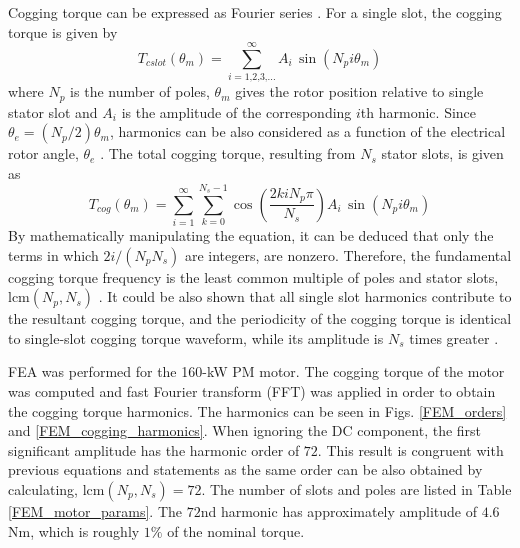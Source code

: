 Cogging torque can be expressed as Fourier series \cite{CTR_HW:2002, CTR_HW:2004, cogging:2006, CTR:2010, CTR_HW:2013, CTR_HW_skew:2013, CTR_SW:2017, CTR_HW:2017}. For a single slot, the cogging torque is given by \cite{cogging:2006, CTR_HW:2013}
\begin{equation}
    T_{cslot}(\theta_m) = \sum_{i=\text{1,2,3,...}}^{\infty} A_i \, \sin(N_pi\theta_m)
    \label{eq_cogging_torque1}
\end{equation}
where $N_p$ is the number of poles, $\theta_m$ gives the rotor position relative to single stator slot and $A_i$ is the amplitude of the corresponding $i$th harmonic. Since $\theta_e = (N_p/2)\theta_m$, harmonics can be also considered as a function of the electrical rotor angle, $\theta_e$ \cite{ILC:2012, ILC:2018}. The total cogging torque, resulting from $N_s$ stator slots, is given as \cite{cogging:2006, CTR_HW:2013}
\begin{equation}
    T_{cog}(\theta_m) = \sum_{i=\text{1}}^{\infty} \sum_{k=\text{0}}^{N_s-1} \cos\left(\frac{2kiN_p\pi}{N_s}\right)A_i \, \sin(N_pi\theta_m)
    \label{eq_cogging_torque2}
\end{equation}
By mathematically manipulating the equation, it can be deduced that only the terms in which $2i/(N_p N_s)$ are integers, are nonzero. Therefore, the fundamental cogging torque frequency is the least common multiple of poles and stator slots, lcm$(N_p, N_s)$ \cite{cogging:2006, CTR_HW:2013, CTR_Analytical:2009}. It could be also shown that all single slot harmonics contribute to the resultant cogging torque, and the periodicity of the cogging torque is identical to single-slot cogging torque waveform, while its amplitude is $N_s$ times greater \cite{cogging:2006}. 

FEA was performed for the 160-kW PM motor. The cogging torque of the motor was computed and fast Fourier transform (FFT) was applied in order to obtain the cogging torque harmonics. The harmonics can be seen in Figs. \ref{FEM_orders} and \ref{FEM_cogging_harmonics}. When ignoring the DC component, the first significant amplitude has the harmonic order of $72$. This result is congruent with previous equations and statements as the same order can be also obtained by calculating, lcm$(N_p, N_s) = 72$. The number of slots and poles are listed in Table \ref{FEM_motor_params}. The $72$nd harmonic has approximately amplitude of $4.6$ Nm, which is roughly $1\%$ of the nominal torque.

